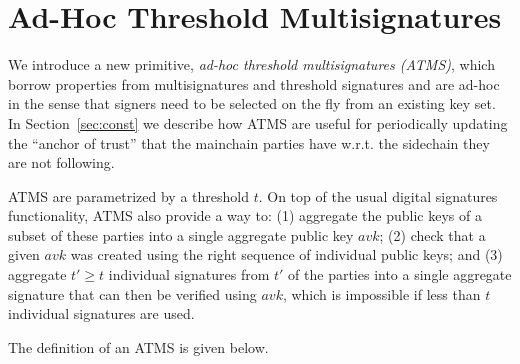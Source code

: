 \section{Ad-Hoc Threshold Multisignatures}
\label{sec:ats}

We  introduce a new  primitive, \textit{ad-hoc threshold
multisignatures (ATMS)}, which borrow  properties from multisignatures and
threshold signatures and are ad-hoc in the sense that signers need to
be selected on the fly from an existing key set.
In Section~\ref{sec:const} we describe how ATMS
are useful for periodically updating the ``anchor of trust'' that the  mainchain parties
 have w.r.t. the sidechain they are not
following.

ATMS %
are parametrized by a threshold $t$.
On top of the usual digital signatures functionality, ATMS also provide a way to:
  (1)
  aggregate the public keys of a subset of these parties into a single aggregate public
  key $avk$;
    (2)
  check that a given $avk$ was created using the right sequence of individual public keys;
  and (3)
  aggregate $t'\geq t$ individual signatures from $t'$ of the parties into a single
    aggregate signature that can then be verified using $avk$, which is
    impossible if less than $t$ individual signatures are used.

The definition of an ATMS is given below.

